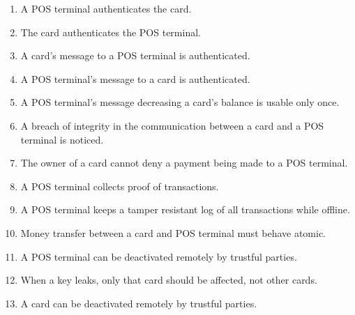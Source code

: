 \begin{enumerate}[label={SR\arabic*:}, leftmargin=3\parindent]
    \item \label{sr:POSAuthCard}
    A POS terminal authenticates the card.
    \item \label{sr:cardAuthPOS}
    The card authenticates the POS terminal.
    \item \label{sr:POScardMessageAuth}
    A card's message to a POS terminal is authenticated.
    \item \label{sr:cardPOSMessageAuth}
    A POS terminal's message to a card is authenticated.
    \item \label{sr:noReplayDecreasingCard}
    A POS terminal's message decreasing a card's balance is usable only once.
    \item \label{sr:cardPOSMessageIntegrity}
    A breach of integrity in the communication between a card and a POS terminal is noticed.
    \item \label{sr:cardNonRepudiation}
    The owner of a card cannot deny a payment being made to a POS terminal.
    \item \label{sr:proofTransaction}
    A POS terminal collects proof of transactions.
    \item \label{sr:logTransaction}
    A POS terminal keeps a tamper resistant log of all transactions while offline.
    \item \label{sr:cardPOStransterAtomic}
    Money transfer between a card and POS terminal must behave atomic. %
    \item \label{sr:disablePOS}
    A POS terminal can be deactivated remotely by trustful parties.

    \item \label{sr:keyLeakage}
    When a key leaks, only that card should be affected, not other cards.
    \item \label{sr:disableCard}
    A card can be deactivated remotely by trustful parties.
\end{enumerate}

